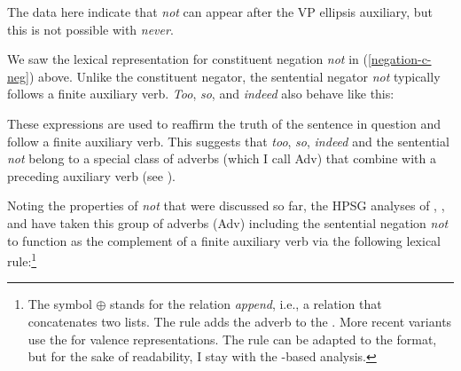\documentclass[output=paper,biblatex,babelshorthands,newtxmath,draftmode,colorlinks,citecolor=brown]{langscibook}
\begin{document}
\begin{exe}
\begin{xlist}
\begin{exe}
\begin{xlist}
\eal
\label{negation-vpe-not-ex}
\zl
%
\noindent The data here indicate that \textit{not} can appear
after the VP ellipsis auxiliary, but this is not possible with
\emph{never}.

\largerpage
We saw the lexical representation for constituent negation \textit{not} in (\ref{negation-c-neg})
above. Unlike the constituent negator, the sentential negator \textit{not} typically follows a
finite auxiliary verb. \textit{Too}, \textit{so}, and \textit{indeed} also behave like this: 

\eal
{} 
\zl

\noindent
These expressions are used to
reaffirm the truth of the sentence in question and
follow a finite auxiliary verb. This suggests that \emph{too}, \emph{so}, \emph{indeed} and the sentential \emph{not} belong to
a special class of adverbs (which I call Adv) that combine with a
preceding auxiliary verb (see \citealt[--95]{Kim:00}).

Noting the properties of \emph{not} that were discussed so far,
the HPSG analyses of \citet{AG:97}, \citet[Section~3.4]{Kim:00}, and \citet{Warner2000a-u}
have taken this group of adverbs (Adv) including the sentential negation \emph{not}
to function as the complement of a finite auxiliary verb via the following lexical
rule:\footnote{The symbol $\oplus$ stands for the relation \emph{append}, i.e., a relation
  that concatenates two lists. The rule adds the adverb to the \compsl. More recent variants
    use the \argstl for valence representations. The rule can be adapted to the \argst format, but
    for the sake of readability, I stay with the \comps-based analysis.}


\end{xlist}
\end{exe}
\end{xlist}
\end{exe}
\end{document}
